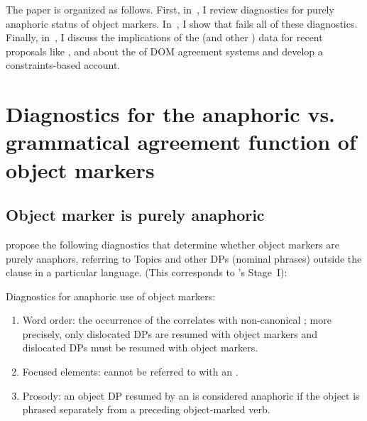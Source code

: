 \documentclass[output=paper]{LSP/langsci}
\begin{document}
\newpage 
The paper is organized as follows. 
First, in~, I review  diagnostics for purely anaphoric status of object markers. 
In~, I show that  fails all of these diagnostics. 
Finally, in~, I discuss the implications of the  (and other ) data for recent proposals like \citet{Creissels2006Typology}, \citet{Dalrympleetal2011Objects} and \citet{Iemmolo2013Symmetric,Iemmolo2014Differential} 
about the  of DOM agreement systems and develop a constraints-based account.


\section{Diagnostics for the anaphoric vs. grammatical agreement function of object markers}\label{02-do-sec:2}

\subsection{Object marker is purely anaphoric}\label{02-do-sec:2-1}

\citet{Bresnanetal1987Topic} propose the following diagnostics that determine whether object markers are purely anaphors, referring to Topics and other DPs (nominal phrases) outside the clause in a particular language. 
(This corresponds to \citeauthor{Creissels2006Typology}'s \citeyear{Creissels2006Typology} Stage~I):

\begin{exe}
\ex
\label{02-do-ex:3}%
Diagnostics for anaphoric use of object markers:
\renewcommand{\theenumi}{\alph{enumi}}
\begin{enumerate}
\item Word order: the occurrence of the  correlates with non-canoni\-cal ; more precisely, only dislocated DPs are resumed with object markers and dislocated DPs must be resumed with object markers.
\item Focused elements: cannot be referred to with an .
\item Prosody: an object DP resumed by an  is considered anaphoric if the object is phrased separately from a preceding object-marked verb.
\end{enumerate}
\end{exe}
\end{document}
